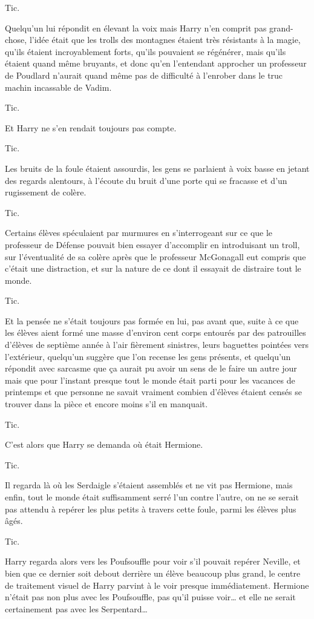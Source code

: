 Tic.

Quelqu'un lui répondit en élevant la voix mais Harry n'en comprit pas grand-chose, l'idée était que les trolls des montagnes étaient très résistants à la magie, qu'ils étaient incroyablement forts, qu'ils pouvaient se régénérer, mais qu'ils étaient quand même bruyants, et donc qu'en l'entendant approcher un professeur de Poudlard n'aurait quand même pas de difficulté à l'enrober dans le truc machin incassable de Vadim.

Tic.

Et Harry ne s'en rendait toujours pas compte.

Tic.

Les bruits de la foule étaient assourdis, les gens se parlaient à voix basse en jetant des regards alentours, à l'écoute du bruit d'une porte qui se fracasse et d'un rugissement de colère.

Tic.

Certains élèves spéculaient par murmures en s'interrogeant sur ce que le professeur de Défense pouvait bien essayer d'accomplir en introduisant un troll, sur l'éventualité de sa colère après que le professeur McGonagall eut compris que c'était une distraction, et sur la nature de ce dont il essayait de distraire tout le monde.

Tic.

Et la pensée ne s'était toujours pas formée en lui, pas avant que, suite à ce que les élèves aient formé une masse d'environ cent corps entourés par des patrouilles d'élèves de septième année à l'air fièrement sinistres, leurs baguettes pointées vers l'extérieur, quelqu'un suggère que l'on recense les gens présents, et quelqu'un répondit avec sarcasme que ça aurait pu avoir un sens de le faire un autre jour mais que pour l'instant presque tout le monde était parti pour les vacances de printemps et que personne ne savait vraiment combien d'élèves étaient censés se trouver dans la pièce et encore moins s'il en manquait.

Tic.

C'est alors que Harry se demanda où était Hermione.

Tic.

Il regarda là où les Serdaigle s'étaient assemblés et ne vit pas Hermione, mais enfin, tout le monde était suffisamment serré l'un contre l'autre, on ne se serait pas attendu à repérer les plus petits à travers cette foule, parmi les élèves plus âgés.

Tic.

Harry regarda alors vers les Poufsouffle pour voir s'il pouvait repérer Neville, et bien que ce dernier soit debout derrière un élève beaucoup plus grand, le centre de traitement visuel de Harry parvint à le voir presque immédiatement.
Hermione n'était pas non plus avec les Poufsouffle, pas qu'il puisse voir… et elle ne serait certainement pas avec les Serpentard…

